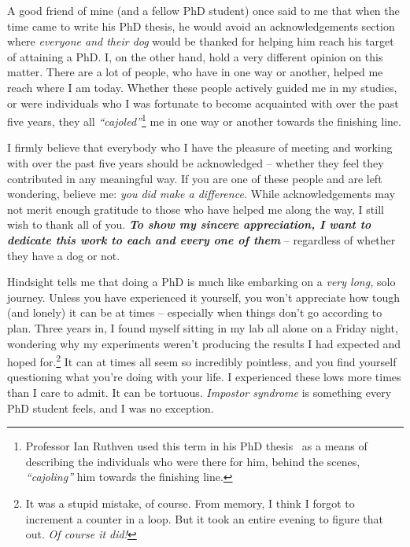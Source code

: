 

\begin{preamble}
\setcounter{footnote}{0}
{}

A good friend of mine (and a fellow PhD student) once said to me that when the time came to write his PhD thesis, he would avoid an acknowledgements section where \emph{everyone and their dog} would be thanked for helping him reach his target of attaining a PhD. I, on the other hand, hold a very different opinion on this matter. There are a lot of people, who have in one way or another, helped me reach where I am today. Whether these people actively guided me in my studies, or were individuals who I was fortunate to become acquainted with over the past five years, they all \emph{``cajoled''}\footnote{Professor Ian Ruthven used this term in his PhD thesis~\citep{ruthven2001phd} as a means of describing the individuals who were there for him, behind the scenes, \emph{``cajoling''} him towards the finishing line.} me in one way or another towards the finishing line.

I firmly believe that everybody who I have the pleasure of meeting and working with over the past five years should be acknowledged -- whether they feel they contributed in any meaningful way. If you are one of these people and are left wondering, believe me: \emph{you did make a difference.} While acknowledgements may not merit enough gratitude to those who have helped me along the way, I still wish to thank all of you. \textbf{\emph{To show my sincere appreciation, I want to dedicate this work to each and every one of them}} -- regardless of whether they have a dog or not.

Hindsight tells me that doing a PhD is much like embarking on a \emph{very long,} solo journey. Unless you have experienced it yourself, you won't appreciate how tough (and lonely) it can be at times -- especially when things don't go according to plan. Three years in, I found myself sitting in my lab all alone on a Friday night, wondering why my experiments weren't producing the results I had expected and hoped for.\footnote{It was a stupid mistake, of course. From memory, I think I forgot to increment a counter in a loop. But it took an entire evening to figure that out. \emph{Of course it did!}} It can at times all seem so incredibly pointless, and you find yourself questioning what you're doing with your life. I experienced these lows more times than I care to admit. It can be tortuous. \emph{Impostor syndrome} is something every PhD student feels, and I was no exception.


\end{preamble}
